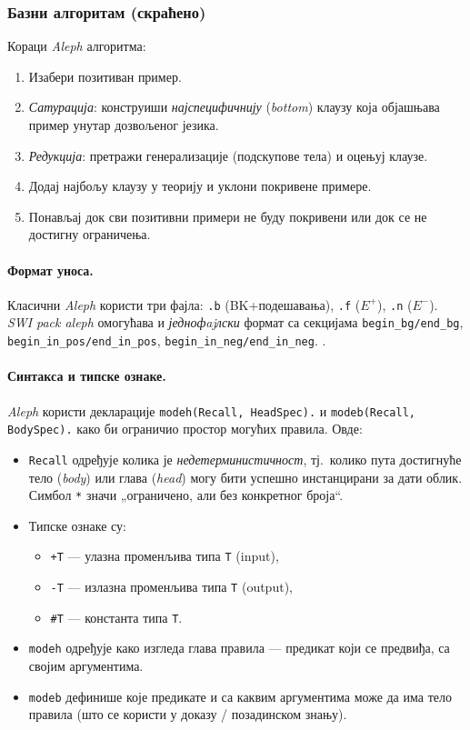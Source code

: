 \subsubsection{Базни алгоритам (скраћено)}
Кораци \emph{Aleph} алгоритма:
\begin{enumerate}
  \item Изабери позитиван пример.
  \item \emph{Сатурација}: конструиши \emph{најспецифичнију} (\emph{bottom}) клаузу која објашњава пример унутар дозвољеног језика.
  \item \emph{Редукција}: претражи генерализације (подскупове тела) и оцењуј клаузе.
  \item Додај најбољу клаузу у теорију и уклони покривене примере.
  \item Понављај док сви позитивни примери не буду покривени или док се не достигну ограничења.
\end{enumerate} \cite{aleph_manual}

\paragraph{Формат уноса.}
Класични \emph{Aleph} користи три фајла: \verb|.b| (BK+подешавања), \verb|.f| (\(E^+\)), \verb|.n| (\(E^-\)). \emph{SWI} \emph{pack aleph} омогућава и \emph{једнофajлски} формат са секцијама \verb|begin_bg/end_bg|, \verb|begin_in_pos/end_in_pos|, \verb|begin_in_neg/end_in_neg|. \cite{aleph_manual}.

\paragraph{Синтакса и типске ознаке.}  
\emph{Aleph} користи декларације \verb|modeh(Recall, HeadSpec).| и \verb|modeb(Recall, BodySpec).| како би ограничио простор могућих правила. Овде:

\begin{itemize}
  \item \verb|Recall| одређује колика је \emph{недетерминистичност}, тј.\ колико пута достигнуће тело (\emph{body}) или глава (\emph{head}) могу бити успешно инстанцирани за дати облик. Симбол \verb|*| значи „ограничено, али без конкретног броја“.  
  \item Типске ознаке су:
  \begin{itemize}
    \item \verb|+T| — улазна променљива типа \texttt{T} (input),  
    \item \verb|-T| — излазна променљива типа \texttt{T} (output),  
    \item \verb|#T| — константа типа \texttt{T}.
  \end{itemize}
  \item \verb|modeh| одређује како изгледа глава правила — предикат који се предвиђа, са својим аргументима.  
  \item \verb|modeb| дефинише које предикате и са каквим аргументима може да има тело правила (што се користи у доказу / позадинском знању).
\end{itemize}


